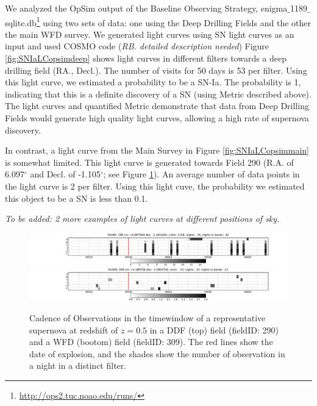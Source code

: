 We analyzed the OpSim output of the Baseline Observing Strategy,
enigma$\_$1189$\_$sqlite.db{\footnote {\url{http://ops2.tuc.noao.edu/runs/}}} using two sets of data: one using the Deep Drilling Fields and the other the main WFD survey. 
We generated light curves using SN light curves as an input and used COSMO code ({\it RB. detailed description needed}) 
Figure \ref{fig:SNIaLCopsimdeep} shows light curves in different
filters towards a deep drilling field (RA., Decl.). The number of visits for 50 days is 53
per filter. Using this light curve, we estimated a probability to be a SN-Ia.
The probability is 1, indicating that this is a definite discovery of a SN (using Metric
described above).   The light curves and quantified Metric demonstrate that data from Deep Drilling Fields
would generate high quality light curves, allowing a high rate of supernova discovery.

In contrast, a light curve from the Main Survey in Figure \ref{fig:SNIaLCopsimmain} is
somewhat limited. 
This light curve is generated towards Field 290 (R.A. of 6.097$^{\circ}$
and Decl. of -1.105$^{\circ}$; see Figure \ref{fig:perSNCadence}). An average number of
data points in the light curve is 2 per filter. Using this light cuve, the probability we
 estimated this object to be a SN is less than 0.1. 

\emph{To be added: 2 more examples of light curves at different positions of sky.}







\begin{figure}[tbh!]
\includegraphics[angle=0,width=\textwidth,clip]{figs/SN_Cadence_290.pdf}
\includegraphics[angle=0,width=\textwidth,clip]{figs/SN_Cadence_309.pdf}
\caption{Cadence of Observations in the timewindow of a representative supernova at redshift of $z=0.5$ in a DDF (top) field (fieldID: 290) and a WFD (bootom) field (fieldID: 309). The red lines show the date of explosion, and the shades show the number of observation in a night in a distinct filter.}
\label{fig:perSNCadence}
\end{figure}



